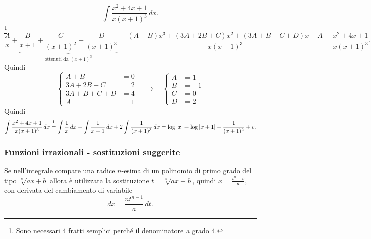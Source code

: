 \begin{example}
    \begin{equation*}
        \int\frac{x^2+4x+1}{x(x+1)^3}\, dx.
    \end{equation*}
    \footnote{Sono necessari 4 fratti semplici perché il denominatore a grado 4.}
    \begin{equation*}
        \frac{A}{x}+\underbrace{\frac{B}{x+1}+\frac{C}{(x+1)^2}+\frac{D}{(x+1)^3}}_{\text{ottenuti da }(x+1)^3}=\frac{(A+B)x^3+(3A+2B+C)x^2+(3A+B+C+D)x+A}{x(x+1)^3}=\frac{x^2+4x+1}{x(x+1)^3}.
    \end{equation*}
    Quindi
    \begin{equation*}
        \begin{cases}
            A+B &=0\\
            3A+2B+C &=2\\
            3A+B+C+D&=4\\
            A &=1
        \end{cases}\quad\rightarrow\quad
        \begin{cases}
            A &=1\\
            B &=-1\\
            C &= 0\\
            D &= 2
        \end{cases}
    \end{equation*}
    Quindi
    \begin{equation*}
        \int\frac{x^2+4x+1}{x(x+1)^3}\, dx \overset{\footnotemark}{=} \int \frac{1}{x}\, dx - \int \frac{1}{x+1}\, dx + 2\int \frac{1}{(x+1)^3}\, dx=\log|x|-\log|x+1| - \frac{1}{(x+1)^2}+c.
    \end{equation*}
\end{example}

\subsubsection{Funzioni irrazionali - sostituzioni suggerite}
Se nell'integrale compare una radice $n$-esima di un polinomio di primo grado del tipo $\sqrt[n]{ax+b}$ allora è utilizzata la sostituzione $t=\sqrt[n]{ax+b}$, quindi $x=\frac{t^n-b}{a}$, con derivata del cambiamento di variabile
\begin{equation*}
    dx=\frac{nt^{n-1}}{a}\, dt.
\end{equation*}

